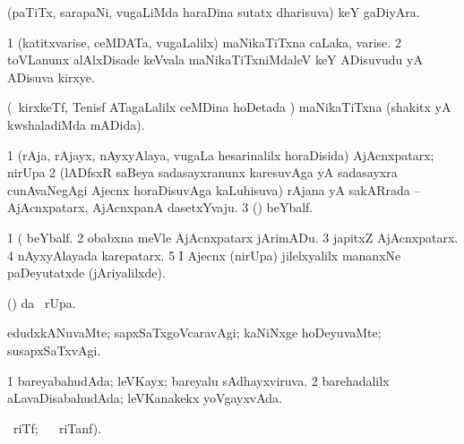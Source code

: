 \begin{center}
\bentry
{} 
\gl{\nA}
\expl{}
\bmng
(paTiTx, sarapaNi, \mo vugaLiMda haraDina sutatx dharisuva) keY gaDiyAra. 
\emng
\eentry

\bentry
{} 
\gl{\nA}
\expl{}
\bmng
\bnum
\num{1} (katitxvarise, ceMDATa, \mo vugaLalilx) maNikaTiTxna caLaka, varise. 
\num{2} toVLanunx alAlxDisade keVvala maNikaTiTxniMdaleV keY ADisuvudu yA ADisuva kirxye. 
\enum
\emng
\eentry

\bentry
{} 
\gl{\gu}
\expl{}
\bmng
(\kanmu\ kirxkeTf, Tenisf ATagaLalilx ceMDina hoDetada \vi) maNikaTiTxna (shakitx yA kwshaladiMda mADida). 
\emng
\eentry

\bentry 
{} 
\gl{\nA}
\expl{}
\bmng
\bnum
\num{1} (rAja, rAjayx, nAyxyAlaya, \mo vugaLa hesarinalilx horaDisida) AjAcnxpatarx; nirUpa 
\num{2} (lADfsxR saBeya sadasayxranunx karesuvAga yA sadasayxra cunAvaNegAgi Ajecnx horaDisuvAga kaLuhisuva) rAjana yA sakARrada -- AjAcnxpatarx, AjAcnxpanA dasetxYvaju. 
\num{3} (\viparx) beYbalf. 
\enum
\emng

\noindent
\gl{\pagu}
\expl{}
\bmng
\bnum
\num{1}  (  beYbalf. 
\num{2}  obabxna meVle AjAcnxpatarx jArimADu. 
\num{3}  japitxZ AjAcnxpatarx. 
\num{4}  nAyxyAlayada karepatarx. 
\num{5}  I Ajecnx (nirUpa) jilelxyalilx mananxNe paDeyutatxde (jAriyalilxde). 
\enum
\emng
\eentry

\bentry 
{} 
\gl{\kirx}
\expl{}
\bmng
(\pArxparx)  \kirx da \BUkaq\ rUpa. 
\emng

\noindent 
\gl{\pagu}
\expl{}
\bmng
{}  edudxkANuvaMte; sapxSaTxgoVcaravAgi; kaNiNxge hoDeyuvaMte; susapxSaTxvAgi. 
\emng
\eentry

\bentry
{} 
\gl{\gu}
\expl{}
\bmng
\bnum
\num{1} bareyabahudAda; leVKayx; bareyalu sAdhayxviruva. 
\num{2} barehadalilx aLavaDisabahudAda; leVKanakekx yoVgayxvAda. 
\enum
\emng
\eentry

\bentry
{} 
\gl{\kirx}
\ucAcx\ riTf; \BUkaq\   \ucAcx\ riTanf). 


\end{center}

